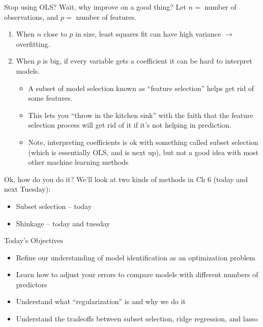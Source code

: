 \documentclass[mathserif, aspectratio=169]{beamer}
\begin{document}
\begin{frame}{Stop using OLS?  Wait, why improve on a good thing?}
Let $n=$ number of observations, and $p=$ number of features.
 \begin{enumerate}
\item When $n$ close to $p$ in size, least squares fit can have high variance $\rightarrow$ overfitting.
\item When $p$ is big, if every variable gets a coefficient it can be hard to interpret models.  
\begin{itemize}
\item A subset of model selection known as ``feature selection'' helps get rid of some features.
\item This lets you ``throw in the kitchen sink'' with the faith that the feature selection process will get rid of it if it's not helping in prediction.
\item Note, interpreting coefficients is ok with something called subset selection (which is essentially OLS, and is next up), but not a good idea with most other machine learning methods
\end{itemize}
\end{enumerate}
\end{frame}

\begin{frame}{Ok, how do you do it?}
We'll look at two kinds of methods in Ch 6 (today and next Tuesday):
\begin{itemize}
\item Subset selection -- today
\item Shinkage -- today and tuesday
\end{itemize}

{\large \color{blue} Today's Objectives}
\begin{itemize}
\item Refine our understanding of model identification as an optimization problem
\item Learn how to adjust your errors to compare models with different numbers of predictors
\item Understand what ``regularization'' is and why we do it
\item Understand the tradeoffs between subset selection, ridge regression, and lasso
\end{itemize}


\end{frame}
\end{document}
